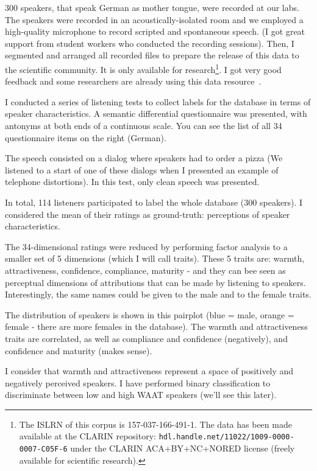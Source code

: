 \documentclass[a4paper]{article}
\begin{document}
300 speakers, that speak German as mother tongue, were recorded at our labs. The speakers were recorded in an acoustically-isolated room and we employed a high-quality microphone to record scripted and spontaneous speech. (I got great support from student workers who conducted the recording sessions). Then, I segmented and arranged all recorded files to prepare the release of this data to the scientific community. It is only available for research\footnote{The ISLRN of this corpus is 157-037-166-491-1. The data has been made available at the CLARIN repository: \texttt{hdl.handle.net/11022/1009-0000-0007-C05F-6} under the CLARIN ACA+BY+NC+NORED license (freely available for scientific research).}. I got very good feedback and some researchers are already using this data resource~\cite{my19, my29}.

I conducted a series of listening tests to collect labels for the database in terms of speaker characteristics. A semantic differential questionnaire was presented, with antonyms at both ends of a continuous scale. You can see the list of all 34 questionnaire items on the right (German).

The speech consisted on a dialog where speakers had to order a pizza (We listened to a start of one of these dialogs when I presented an example of telephone distortions). In this test, only clean speech was presented.

In total, 114 listeners participated to label the whole database (300 speakers). I considered the mean of their ratings as ground-truth: perceptions of speaker characteristics.

The 34-dimensional ratings were reduced by performing factor analysis to a smaller set of 5 dimensions (which I will call traits). These 5 traits are: warmth, attractiveness, confidence, compliance, maturity - and they can bee seen as perceptual dimensions of attributions that can be made by listening to speakers. Interestingly, the same names could be given to the male and to the female traits.

The distribution of speakers is shown in this pairplot (blue = male, orange = female - there are more females in the database). The warmth and attractiveness traits are correlated, as well as compliance and confidence (negatively), and confidence and maturity (makes sense).

I consider that warmth and attractiveness represent a space of positively and negatively perceived speakers. I have performed binary classification to discriminate between low and high WAAT speakers (we'll see this later).
\end{document}
